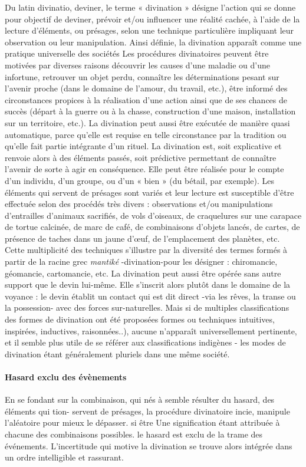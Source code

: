 Du latin divinatio, deviner, le terme « divination » désigne l'action qui se donne pour objectif de deviner, prévoir et/ou influencer une réalité cachée, à l'aide de la lecture d'éléments, ou présages, selon une technique particulière impliquant leur observation ou leur manipulation. Ainsi définie, la divination apparaît comme une pratique universelle des sociétés  Les procédures divinatoires peuvent être motivées par diverses raisons découvrir les causes d'une maladie ou d'une infortune, retrouver un objet perdu, connaître les déterminations pesant sur l'avenir proche (dans le domaine de l'amour, du travail, etc.), être informé des circonstances propices à la réalisation d'une action ainsi que de ses chances de succès (départ à la guerre ou à la chasse, construction d'une maison, installation sur un territoire, etc.). La divination peut aussi être exécutée de manière quasi automatique, parce qu'elle est requise en telle circonstance par la tradition ou qu'elle fait partie intégrante d'un rituel. La divination est, soit explicative   et renvoie alors à des éléments passés, soit prédictive permettant de
connaître l'avenir de sorte à agir en conséquence. Elle peut être réalisée pour le compte d'un individu, d'un groupe, ou d'un « bien » (du bétail, par exemple).
Les éléments qui servent de présages sont variés et leur lecture est susceptible d'être effectuée selon des procédés très divers : observations et/ou manipulations d'entrailles d'animaux sacrifiés, de vols d'oiseaux, de craquelures sur une carapace de tortue calcinée, de marc de café, de combinaisons d'objets lancés, de cartes, de présence de taches dans un jaune d'œuf, de l'emplacement des planètes, etc. Cette multiplicité des techniques s'illustre par la diversité des termes formés à partir de la racine grec \textit{mantiké} -divination-pour les désigner : chiromancie, géomancie, cartomancie, etc. La divination peut aussi être opérée sans autre support que le devin lui-même. Elle s'inscrit alors plutôt dans le domaine de la voyance : le devin établit un contact qui est dit direct -via les rêves, la transe ou la possession- avec des forces sur-naturelles. Mais si de multiples classifications des formes de divination ont été proposées formes ou techniques intuitives, inspirées, inductives, raisonnées..), aucune n'apparaît universellement pertinente, et il semble plus utile de se référer aux classifications indigènes
- les modes de divination étant généralement pluriels dans une même société.

\paragraph{Hasard exclu des évènements}
En se fondant sur la combinaison, qui
nés à semble résulter du hasard, des éléments qui tion- servent de présages, la procédure divinatoire incie, manipule l'aléatoire pour mieux le dépasser.
si être
Une signification étant attribuée à chacune
 des combinaisons possibles. le hasard est   exclu de la trame des événements. L'incertitude qui motive la divination se trouve alors   intégrée dans un ordre intelligible et
  rassurant.

